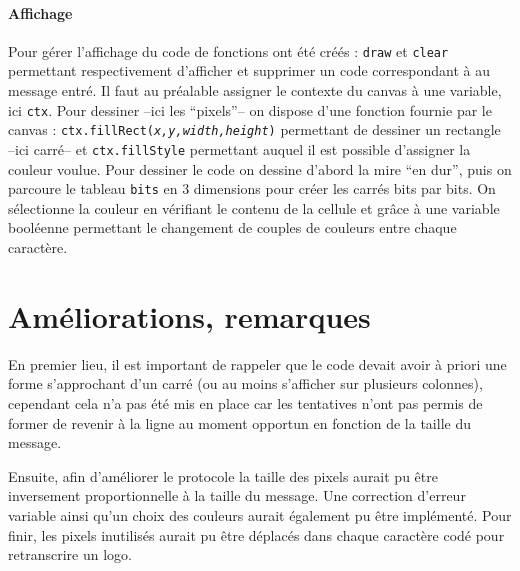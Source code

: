 \documentclass[12pt, a4paper]{article}
\begin{document}
\paragraph{Affichage} Pour gérer l'affichage du code de fonctions ont été créés : \texttt{draw} et \texttt{clear} permettant respectivement d'afficher et supprimer un code correspondant à au message entré. Il faut au préalable assigner le contexte du canvas à une variable, ici \texttt{ctx}. Pour dessiner --ici les ``pixels''-- on dispose d'une fonction fournie par le canvas : \texttt{ctx.fillRect(\emph{x,y,width,height})} permettant de dessiner un rectangle --ici carré-- et \texttt{ctx.fillStyle} permettant auquel il est possible d'assigner la couleur voulue.
Pour dessiner le code on dessine d'abord la mire ``en dur'', puis on parcoure le tableau \texttt{bits} en 3 dimensions pour créer les carrés bits par bits. On sélectionne la couleur en vérifiant le contenu de la cellule et grâce à une variable booléenne permettant le changement de couples de couleurs entre chaque caractère.

\section*{Améliorations, remarques}

En premier lieu, il est important de rappeler que le code devait avoir à priori une forme s'approchant d'un carré (ou au moins s'afficher sur plusieurs colonnes), cependant cela n'a pas été mis en place car les tentatives n'ont pas permis de former de revenir à la ligne au moment opportun en fonction de la taille du message.

Ensuite, afin d'améliorer le protocole la taille des pixels aurait pu être inversement proportionnelle à la taille du message. Une correction d'erreur variable ainsi qu'un choix des couleurs aurait également pu être implémenté. Pour finir, les pixels inutilisés aurait pu être déplacés dans chaque caractère codé pour retranscrire un logo.






\end{document}
